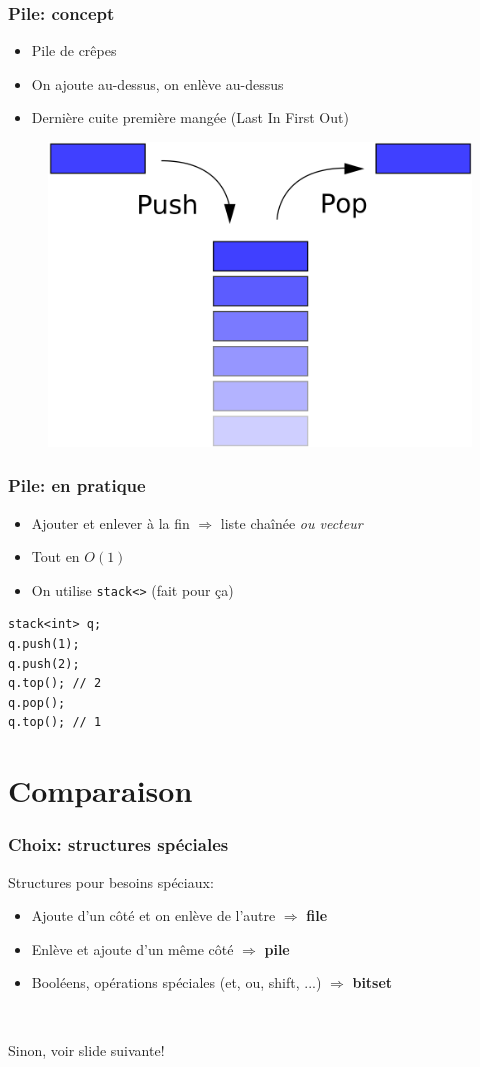 \documentclass[12pt]{beamer}
\begin{document}
\begin{frame}
\frametitle{Pile: concept}
\begin{itemize}
\item Pile de crêpes
\item On ajoute au-dessus, on enlève au-dessus
\item Dernière cuite première mangée (Last In First Out)
\end{itemize}
\begin{figure}
\centering
\includegraphics[width=.5\textwidth]{img/stack}
\end{figure}
\end{frame}

\begin{frame}[fragile]
\frametitle{Pile: en pratique}
\begin{itemize}
\item Ajouter et enlever à la fin $\Rightarrow$ liste chaînée \emph{ou vecteur}
\item Tout en $O(1)$
\item On utilise \texttt{stack<>} (fait pour ça)
\end{itemize}
\begin{lstlisting}
stack<int> q;
q.push(1);
q.push(2);
q.top(); // 2
q.pop();
q.top(); // 1
\end{lstlisting}
\end{frame}

\section{Comparaison}

\begin{frame}
\frametitle{Choix: structures spéciales}
Structures pour besoins spéciaux:
\begin{itemize}
\item Ajoute d'un côté et on enlève de l'autre $\Rightarrow$ \textbf{file}
\item Enlève et ajoute d'un même côté $\Rightarrow$ \textbf{pile}
\item Booléens, opérations spéciales (et, ou, shift, ...) $\Rightarrow$ \textbf{bitset}
\end{itemize}

~

Sinon, voir slide suivante!
\end{frame}
\end{document}
